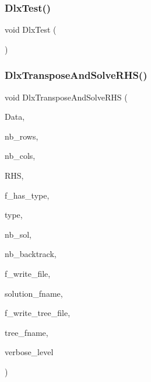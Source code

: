 \subsubsection{\texorpdfstring{Dlx\+Test()}{DlxTest()}}
{\footnotesize\ttfamily void Dlx\+Test (\begin{DoxyParamCaption}{ }\end{DoxyParamCaption})}

\mbox{\label{_l_i_b_2_g_a_l_o_i_s_2dlx_8_c_ae4b7ea72e7db2005606be60f7fd70b94}} 
\subsubsection{\texorpdfstring{Dlx\+Transpose\+And\+Solve\+R\+H\+S()}{DlxTransposeAndSolveRHS()}}
{\footnotesize\ttfamily void Dlx\+Transpose\+And\+Solve\+R\+HS (\begin{DoxyParamCaption}\item[{\mbox{\hyperlink{galois_8h_a09fddde158a3a20bd2dcadb609de11dc}{I\+NT}} $\ast$}]{Data,  }\item[{\mbox{\hyperlink{galois_8h_a09fddde158a3a20bd2dcadb609de11dc}{I\+NT}}}]{nb\+\_\+rows,  }\item[{\mbox{\hyperlink{galois_8h_a09fddde158a3a20bd2dcadb609de11dc}{I\+NT}}}]{nb\+\_\+cols,  }\item[{\mbox{\hyperlink{galois_8h_a09fddde158a3a20bd2dcadb609de11dc}{I\+NT}} $\ast$}]{R\+HS,  }\item[{\mbox{\hyperlink{galois_8h_a09fddde158a3a20bd2dcadb609de11dc}{I\+NT}}}]{f\+\_\+has\+\_\+type,  }\item[{\mbox{\hyperlink{galois_8h_a331aa0f3283349b42f6bab83e017cdc1}{diophant\+\_\+equation\+\_\+type}} $\ast$}]{type,  }\item[{\mbox{\hyperlink{galois_8h_a09fddde158a3a20bd2dcadb609de11dc}{I\+NT}} \&}]{nb\+\_\+sol,  }\item[{\mbox{\hyperlink{galois_8h_a09fddde158a3a20bd2dcadb609de11dc}{I\+NT}} \&}]{nb\+\_\+backtrack,  }\item[{\mbox{\hyperlink{galois_8h_a09fddde158a3a20bd2dcadb609de11dc}{I\+NT}}}]{f\+\_\+write\+\_\+file,  }\item[{const \mbox{\hyperlink{galois_8h_ab6cc7b4aeb6ea31aba2b3fbfc83ff5e6}{B\+Y\+TE}} $\ast$}]{solution\+\_\+fname,  }\item[{\mbox{\hyperlink{galois_8h_a09fddde158a3a20bd2dcadb609de11dc}{I\+NT}}}]{f\+\_\+write\+\_\+tree\+\_\+file,  }\item[{const \mbox{\hyperlink{galois_8h_ab6cc7b4aeb6ea31aba2b3fbfc83ff5e6}{B\+Y\+TE}} $\ast$}]{tree\+\_\+fname,  }\item[{\mbox{\hyperlink{galois_8h_a09fddde158a3a20bd2dcadb609de11dc}{I\+NT}}}]{verbose\+\_\+level }\end{DoxyParamCaption})}

